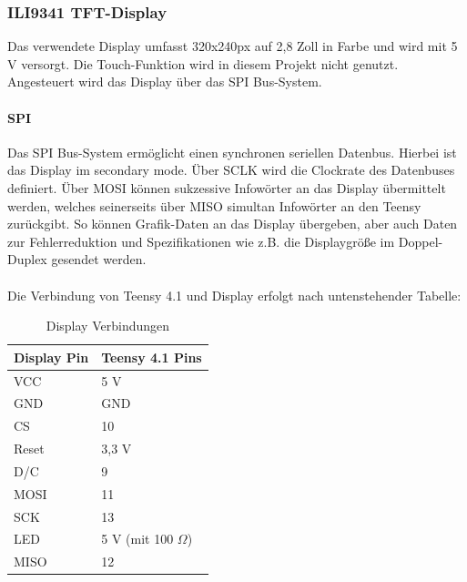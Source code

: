 \documentclass[12pt]{article}
\begin{document}
\subsubsection{ILI9341 TFT-Display}
Das verwendete Display umfasst 320x240px auf 2,8 Zoll in Farbe und wird mit 5 V versorgt.
Die Touch-Funktion wird in diesem Projekt nicht genutzt.
Angesteuert wird das Display über das SPI Bus-System.

\paragraph{SPI}
Das SPI Bus-System ermöglicht einen synchronen seriellen Datenbus. Hierbei ist das Display im \glq secondary mode\grq{}\:.
Über SCLK wird die Clockrate des Datenbuses definiert. Über \glq MOSI\grq{}\: können sukzessive Infowörter an das Display übermittelt werden, welches 
seinerseits über \glq MISO\grq{}\: simultan Infowörter an den Teensy zurückgibt. So können Grafik-Daten an das Display übergeben, aber auch Daten zur 
Fehlerreduktion und Spezifikationen wie z.B. die Displaygröße im Doppel-Duplex gesendet werden.
\\
\\
Die Verbindung von Teensy 4.1 und Display erfolgt nach untenstehender Tabelle:
\begin{table}[h]
  \centering
  \caption{Display Verbindungen}
  \label{tbl:displayverbindungen}
  \begin{tabular}{l|l}
    \textbf{Display Pin}  & \textbf{Teensy 4.1 Pins}\\
    \hline
    VCC & 5 V\\
 
    GND	 & GND\\
 
    CS	 & 10\\

    Reset	 & 3,3 V\\

    D/C	 & 9\\

    MOSI	 & 11\\

    SCK	 & 13\\

    LED	 & 5 V (mit 100 $\Omega$)\\

    MISO	 & 12\\
   

  \end{tabular}    

\end{table}
\end{document}
